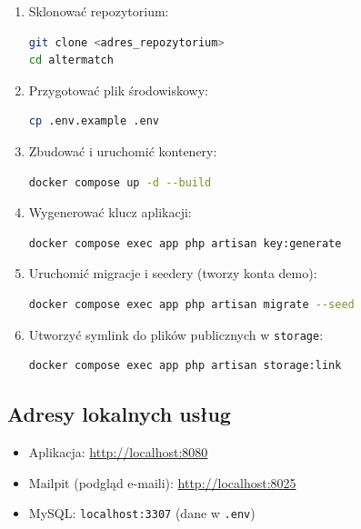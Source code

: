 \documentclass[12pt,a4paper]{article}
\begin{document}
\begin{enumerate}

    \item Sklonować repozytorium:
\begin{lstlisting}[language=bash]
git clone <adres_repozytorium>
cd altermatch
\end{lstlisting}

    \item Przygotować plik środowiskowy:
\begin{lstlisting}[language=bash]
cp .env.example .env
\end{lstlisting}

    \item Zbudować i uruchomić kontenery:
\begin{lstlisting}[language=bash]
docker compose up -d --build
\end{lstlisting}

    \item Wygenerować klucz aplikacji:
\begin{lstlisting}[language=bash]
docker compose exec app php artisan key:generate
\end{lstlisting}

    \item Uruchomić migracje i seedery (tworzy konta demo):
\begin{lstlisting}[language=bash]
docker compose exec app php artisan migrate --seed
\end{lstlisting}

    \item Utworzyć symlink do plików publicznych w \texttt{storage}:
\begin{lstlisting}[language=bash]
docker compose exec app php artisan storage:link
\end{lstlisting}

\end{enumerate}

\subsection{Adresy lokalnych usług}

\begin{itemize}
    \item Aplikacja: \url{http://localhost:8080}
    \item Mailpit (podgląd e-maili): \url{http://localhost:8025}
    \item MySQL: \texttt{localhost:3307} (dane w \texttt{.env})
\end{itemize}
\end{document}
